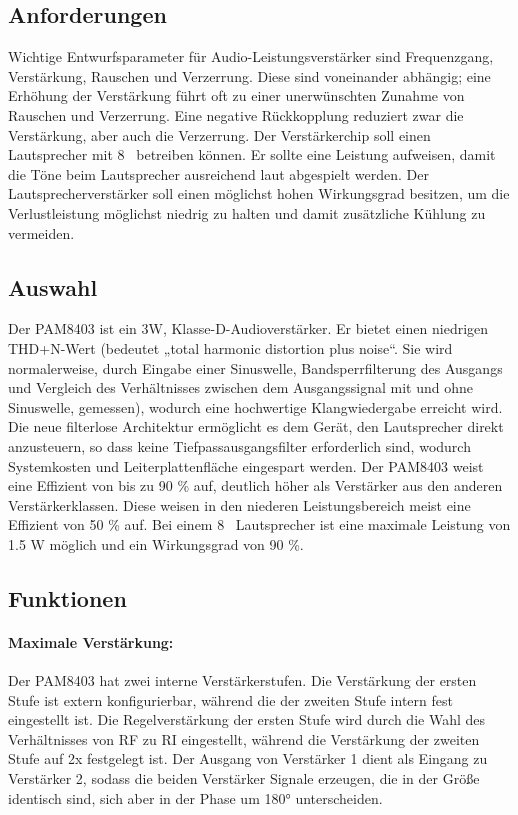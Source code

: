 \subsection{Anforderungen}
Wichtige Entwurfsparameter für Audio-Leistungsverstärker sind Frequenzgang, Verstärkung, Rauschen und Verzerrung.
Diese sind voneinander abhängig; eine Erhöhung der Verstärkung führt oft zu einer unerwünschten Zunahme von Rauschen und Verzerrung.
Eine negative Rückkopplung reduziert zwar die Verstärkung, aber auch die Verzerrung.
Der Verstärkerchip soll einen Lautsprecher mit 8 \tOmega\ betreiben können.
Er sollte eine Leistung aufweisen, damit die Töne beim Lautsprecher ausreichend laut abgespielt werden.
Der Lautsprecherverstärker soll einen möglichst hohen Wirkungsgrad besitzen, um die Verlustleistung möglichst niedrig zu halten und damit zusätzliche Kühlung zu vermeiden.

\subsection{Auswahl}
Der PAM8403 ist ein 3W, Klasse-D-Audioverstärker. Er bietet einen niedrigen THD+N-Wert (bedeutet „total harmonic distortion plus noise“.
Sie wird normalerweise, durch Eingabe einer Sinuswelle, Bandsperrfilterung des Ausgangs und Vergleich des Verhältnisses zwischen dem Ausgangssignal mit und ohne Sinuswelle, gemessen), wodurch eine hochwertige Klangwiedergabe erreicht wird. 
Die neue filterlose Architektur ermöglicht es dem Gerät, den Lautsprecher direkt anzusteuern, so dass keine Tiefpassausgangsfilter erforderlich sind, wodurch Systemkosten und Leiterplattenfläche eingespart werden.
Der PAM8403 weist eine Effizient von bis zu 90 \% auf, deutlich höher als Verstärker aus den anderen Verstärkerklassen.
Diese weisen in den niederen Leistungsbereich meist eine Effizient von 50 \% auf.
Bei einem 8 \tOmega\ Lautsprecher ist eine maximale Leistung von 1.5 W möglich und ein Wirkungsgrad von 90 \%.

\subsection{Funktionen}
\paragraph{Maximale Verstärkung:}
Der PAM8403 hat zwei interne Verstärkerstufen.
Die Verstärkung der ersten Stufe ist extern konfigurierbar, während die der zweiten Stufe intern fest eingestellt ist.
Die Regelverstärkung der ersten Stufe wird durch die Wahl des Verhältnisses von RF zu RI eingestellt, während die Verstärkung der zweiten Stufe auf 2x festgelegt ist.
Der Ausgang von Verstärker 1 dient als Eingang zu Verstärker 2, sodass die beiden Verstärker Signale erzeugen, die in der Größe identisch sind, sich aber in der Phase um 180° unterscheiden.

